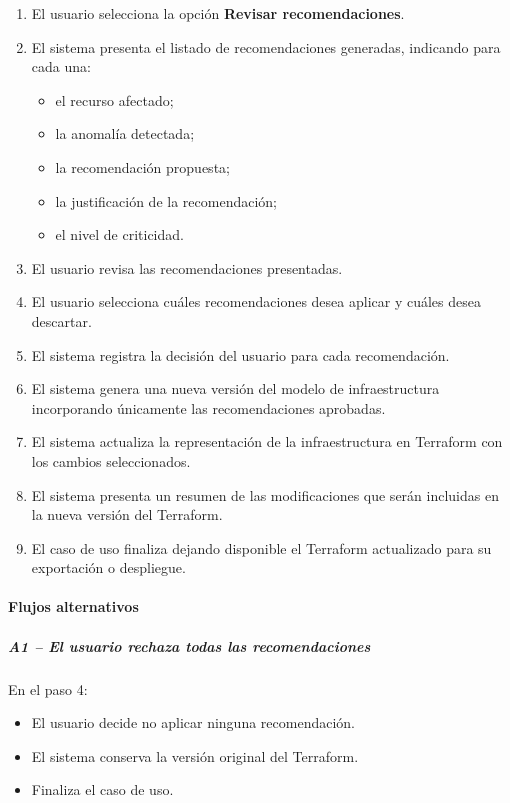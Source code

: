 \begin{enumerate}
\item El usuario selecciona la opción \textbf{Revisar recomendaciones}.
\item El sistema presenta el listado de recomendaciones generadas, indicando para cada una:
  \begin{itemize}
  \item el recurso afectado;
  \item la anomalía detectada;
  \item la recomendación propuesta;
  \item la justificación de la recomendación;
  \item el nivel de criticidad.
  \end{itemize}
\item El usuario revisa las recomendaciones presentadas.
\item El usuario selecciona cuáles recomendaciones desea aplicar y cuáles desea descartar.
\item El sistema registra la decisión del usuario para cada recomendación.
\item El sistema genera una nueva versión del modelo de infraestructura incorporando únicamente las recomendaciones aprobadas.
\item El sistema actualiza la representación de la infraestructura en Terraform con los cambios seleccionados.
\item El sistema presenta un resumen de las modificaciones que serán incluidas en la nueva versión del Terraform.
\item El caso de uso finaliza dejando disponible el Terraform actualizado para su exportación o despliegue.
\end{enumerate}

\paragraph*{Flujos alternativos}

\subparagraph{A1 -- El usuario rechaza todas las recomendaciones}

En el paso 4:

\begin{itemize}
\item El usuario decide no aplicar ninguna recomendación.
\item El sistema conserva la versión original del Terraform.
\item Finaliza el caso de uso.
\end{itemize}

